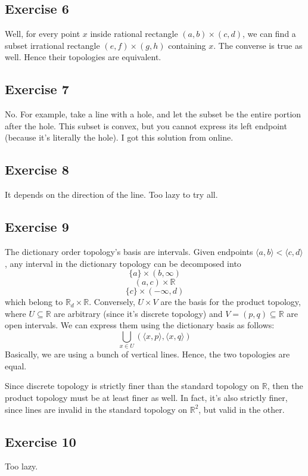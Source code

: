 \documentclass{book}
\begin{document}
\subsection*{Exercise 6}
Well, for every point $x$ inside rational rectangle $(a, b) \times (c, d)$, we can find a subset irrational rectangle $(e, f) \times (g, h)$ containing $x$. The converse is true as well. Hence their topologies are equivalent.

\subsection*{Exercise 7}
No. For example, take a line with a hole, and let the subset be the entire portion after the hole. This subset is convex, but you cannot express its left endpoint (because it's literally the hole). I got this solution from online.

\subsection*{Exercise 8}
It depends on the direction of the line. Too lazy to try all.

\subsection*{Exercise 9}
The dictionary order topology's basis are intervals. Given endpoints $\langle a, b \rangle < \langle c, d \rangle$, any interval in the dictionary topology can be decomposed into
$$\{ a \} \times (b, \infty)$$
$$(a, c) \times \mathbb{R}$$
$$\{ c \} \times (-\infty, d)$$
which belong to $\mathbb{R}_d \times \mathbb{R}$. Conversely, $U \times V$ are the basis for the product topology, where $U \subseteq \mathbb{R}$ are arbitrary (since it's discrete topology) and $V = (p, q) \subseteq \mathbb{R}$ are open intervals. We can express them using the dictionary basis as follows:
$$\bigcup_{x \in U} (\langle x, p \rangle, \langle x, q \rangle)$$
Basically, we are using a bunch of vertical lines. Hence, the two topologies are equal.

Since discrete topology is strictly finer than the standard topology on $\mathbb{R}$, then the product topology must be at least finer as well. In fact, it's also strictly finer, since lines are invalid in the standard topology on $\mathbb{R}^2$, but valid in the other.

\subsection*{Exercise 10}
Too lazy.
\end{document}
